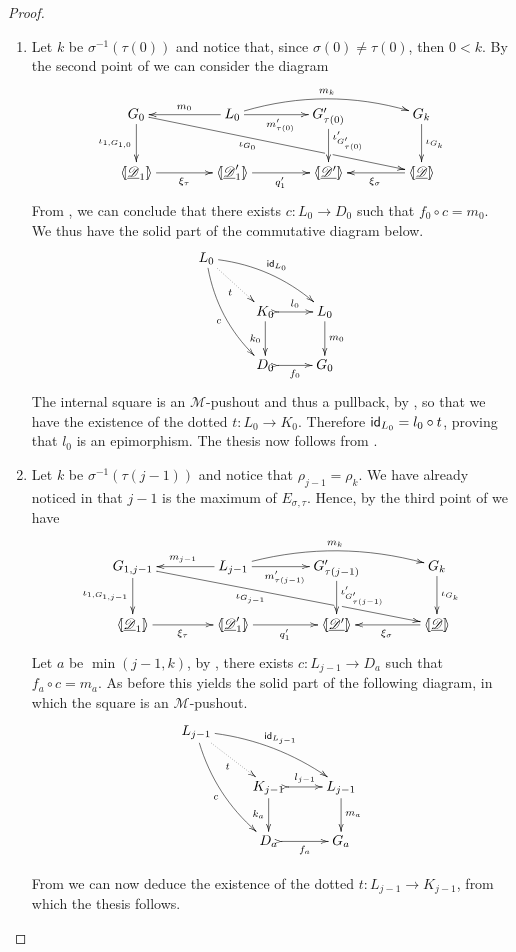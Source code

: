 \begin{proof}
	\begin{enumerate}
		\item Let $k$ be $\sigma^{-1}(\tau(0))$ and notice that, since $\sigma(0)\neq \tau(0)$, then $0< k$.  By  the second point of   we can consider the diagram
		\[\xymatrix@C=40pt{G_{0} \ar[drrr]_(.4){\iota_{G_0}}|(.675)\hole \ar[d]_{\iota_{1,G_{1,0}}}& L_0 \ar[r]_{m'_{\tau(0)}} \ar@/^.4cm/[rr]^{m_{k}} \ar[l]_{m_{0}} &G'_{\tau(0)} \ar[d]^(.45){\iota'_{G'_{\tau(0)}}} & G_{k} \ar[d]^{\iota_{G_k}}\\ \lpro\der{D}_1 \rpro \ar[r]_{\xi_{\tau}} &\lpro \der{D}'_1\rpro \ar[r]_{q'_1} & \lpro \der{D'}\rpro & \tpro{D} \ar[l]^{\xi_{\sigma}}}\]
		From , we can conclude that there exists $c\colon L_0\to D_0$ such that $f_0\circ c=m_0$. We thus have the solid part of the commutative diagram below.
		\[\xymatrix{L_0 \ar@/^.3cm/[drr]^{\id{L_0}} \ar@{.>}[dr]_{t} \ar@/_.3cm/[ddr]_{c}\\ & K_0 \ar[d]_{k_0}\ar@{>->}[r]^{l_0}& L_0 \ar[d]^{m_0} \\& D_0 \ar@{>->}[r]_{f_0} & G_0} \]
		The internal square is an $\mathcal{M}$-pushout and thus a pullback, by , so that we have the existence of the dotted $t\colon L_0\to K_0$. Therefore $\mathsf{id}_{L_0}=l_0\circ t$, proving that $l_0$ is an epimorphism. The thesis now follows from . 
		\item  Let $k$ be $\sigma^{-1}(\tau(j-1))$ and notice that $\rho_{j-1}=\rho_k$. We have already noticed in  that $j-1$ is the maximum of $E_{\sigma, \tau}$.  Hence, by the third point of  we have
		\[\xymatrix@C=40pt{G_{1,{j-1}} \ar[drrr]_(.4){\iota_{G_{j-1}}}|(.675)\hole \ar[d]_{\iota_{1,G_{1,j-1}}}& L_{j-1} \ar[r]_{m'_{\tau({j-1})}} \ar@/^.4cm/[rr]^{m_{k}} \ar[l]_{m_{{j-1}}} &G'_{\tau({j-1})} \ar[d]^{\iota'_{G'_{\tau({j-1})}}} & G_{k} \ar[d]^{\iota_{G_k}}\\ \lpro\der{D}_1 \rpro \ar[r]_{\xi_{\tau}} &\lpro \der{D}'_1\rpro \ar[r]_{q'_1} & \lpro \der{D'}\rpro & \tpro{D} \ar[l]^{\xi_{\sigma}}}\]
		Let $a$ be $\min(j-1, k)$, by ,  there exists $c\colon L_{j-1}\to D_a$ such that $f_a\circ c=m_a$. As before this yields the solid part of the following diagram, in which the square is an $\mathcal{M}$-pushout.
		\[\xymatrix{L_{j-1} \ar@/^.3cm/[drr]^{\id{L_{j-1}}} \ar@{.>}[dr]_{t} \ar@/_.3cm/[ddr]_{c}\\ & K_{j-1} \ar[d]_{k_a}\ar@{>->}[r]^{l_{j-1}}& L_{j-1} \ar[d]^{m_a} \\& D_a \ar@{>->}[r]_{f_a} & G_a} \]

	From  we can now deduce the existence of the dotted $t\colon L_{j-1}\to K_{j-1}$, from which the thesis  follows. \qedhere
	\end{enumerate}
\end{proof}


